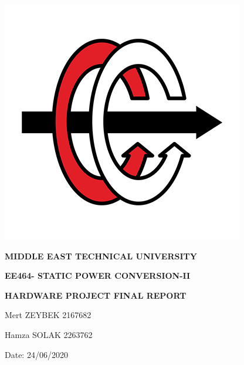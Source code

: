 \documentclass{article}
\date{}
\newcommand\tab[1][1cm]{\hspace*{#1}}
\begin{document}
\begin{figure}[!tp]
\vspace{-10mm}
\includegraphics[scale=0.8]{ee.png}


\vfil
\hfil \Large \bf MIDDLE EAST TECHNICAL UNIVERSITY
 \hfil
\vfil

\vspace{5mm}
\vfil
\hfil \large \bf  EE464- STATIC POWER CONVERSION-II
 \hfil
\vfil

\vspace{5mm}
\vfil
\hfil \large \bf HARDWARE PROJECT FINAL REPORT \hfil
\vfil
\bf

\vspace{23mm}
Mert ZEYBEK    \tab\tab 2167682


Hamza SOLAK \tab\tab2263762


\vspace{5mm}
\small Date: 24/06/2020


\end{figure}

\newpage
\tab\tab
\end{document}
